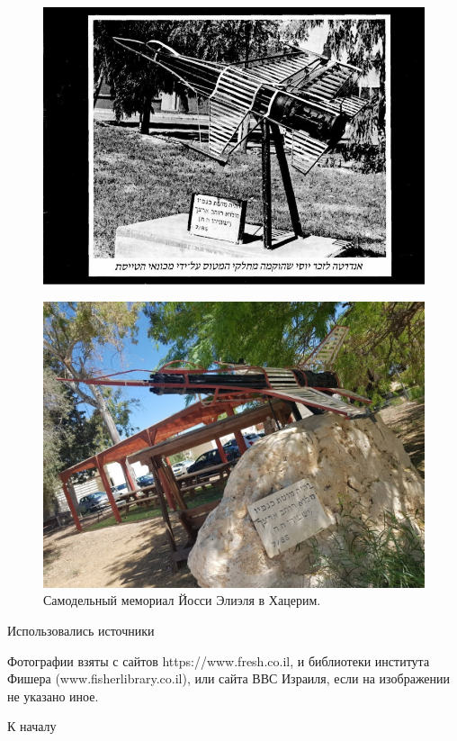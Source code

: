 \begin{figure}[h!tb] 
	\centering\includegraphics[scale=0.6]{History_Yosya/J3-qpraOxxo.jpg}
\end{figure}
\begin{figure}[h!tb] 
	\centering\includegraphics[scale=0.4]{History_Yosya/-O0VmNmFlaU.jpg}
	\caption{Самодельный мемориал Йосси Элиэля в Хацерим.}%
\end{figure}

Использовались источники 

Фотографии взяты с сайтов https://www.fresh.co.il, и библиотеки института Фишера (www.fisherlibrary.co.il), или сайта ВВС Израиля, если на изображении не указано иное.

К началу \pageref{tablecont}
